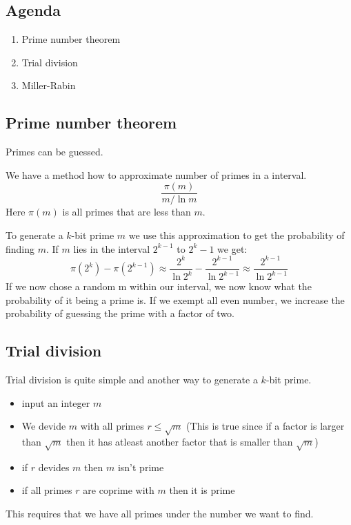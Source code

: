 

\subsection*{Agenda}
\begin{enumerate}
\item Prime number theorem
\item Trial division
\item Miller-Rabin
\end{enumerate}

\subsection{Prime number theorem}
Primes can be guessed.

We have a method how to approximate number of primes in a interval.
\[ \frac{\pi (m)}{m/\ln m} \]
Here $\pi (m)$ is all primes that are less than $m$.

To generate a $k$-bit prime $m$ we use this approximation to get the
probability of finding $m$. If $m$ lies in the interval $2^{k-1}$ to
$2^k-1$ we get:
\[
\pi (2^k)-\pi (2^{k-1}) \approx
\frac{2^k}{\ln 2^k}-\frac{2^{k-1}}{\ln 2^{k-1}}
\approx \frac{2^{k-1}}{\ln 2^{k-1}}
\]
If we now chose a random m within our interval, we now know what the
probability of it being a prime is. If we exempt all even number, we
increase the probability of guessing the prime with a factor of two.

\subsection{Trial division}
Trial division is quite simple and another way to generate a $k$-bit
prime.
\begin{itemize}
\item input an integer $m$
\item We devide $m$ with all primes $r\le \sqrt{m}$ (This is true since
  if a factor is larger than $\sqrt{m}$ then it has atleast another
  factor that is smaller than $\sqrt{m}$)
\item if $r$ devides $m$ then $m$ isn't prime
\item if all primes $r$ are coprime with $m$ then it is prime
\end{itemize}
This requires that we have all primes under the number we want to find.

